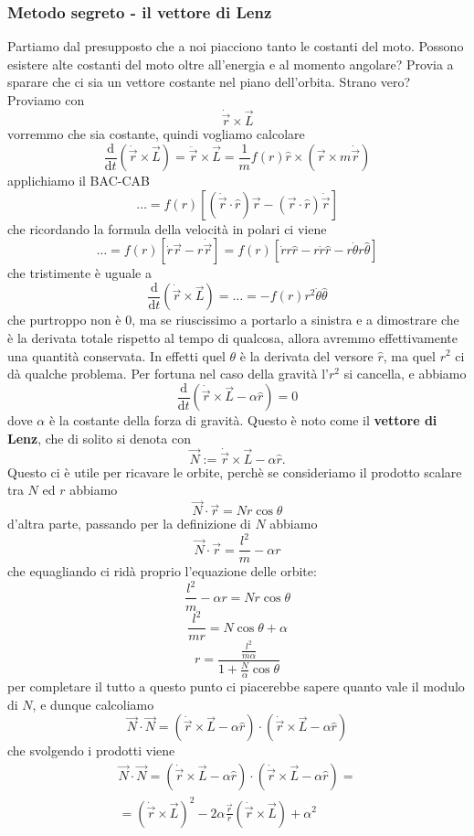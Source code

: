 \documentclass[11pt]{scrartcl}
\newcommand{\dif}{\text{d}}
\newcommand{\posit}{\vec{r}}
\newcommand{\veloc}{\dot{\vec{r}}}
\newcommand{\accel}{\ddot{\vec{r}}}
\begin{document}
	\newpage
	
	\subsubsection{Metodo segreto - il vettore di Lenz}
	
	Partiamo dal presupposto che a noi piacciono tanto le costanti del moto. Possono esistere alte costanti del moto oltre all'energia e al momento angolare? Provia a sparare che ci sia un vettore costante nel piano dell'orbita. Strano vero? Proviamo con 
	$$\veloc\times \vec{L}$$
	vorremmo che sia costante, quindi vogliamo calcolare
	$$\frac{\dif}{\dif t}\left(\veloc\times \vec{L}\right)=\accel\times \vec{L}=\frac{1}{m}f(r)\hat{r}\times \left(\posit\times m\veloc\right)$$
	applichiamo il BAC-CAB 
	$$\dots=f(r)\left[\left(\veloc \cdot \hat{r}\right)\posit-\left(\posit\cdot \hat{r}\right)\veloc\right]$$
	che ricordando la formula della velocità in polari ci viene
	$$\dots=f(r)\left[\dot{r}\posit-r\veloc\right]=f(r)\left[\dot{r}r\hat{r}-r\dot{r}\hat{r}-r\dot{\theta}r\hat{\theta}\right]$$
	che tristimente è uguale a 
	$$\frac{\dif}{\dif t}\left(\veloc\times \vec{L}\right)=\dots =-f(r)r^2\dot{\theta}\hat{\theta}$$
	che purtroppo non è $0$, ma se riuscissimo a portarlo a sinistra e a dimostrare che è la derivata totale rispetto al tempo di qualcosa, allora avremmo effettivamente una quantità conservata. In effetti quel $\theta$ è la derivata del versore $\hat{r}$, ma quel $r^2$ ci dà qualche problema. Per fortuna nel caso della gravità l'$r^2$ si cancella, e abbiamo
	$$\frac{\dif}{\dif t}\left(\veloc\times \vec{L}-\alpha\hat{r}\right)=0$$
	dove $\alpha$ è la costante della forza di gravità. Questo è noto come il \textbf{vettore di Lenz}, che di solito si denota con 
	$$\vec{N}:=\veloc\times \vec{L}-\alpha\hat{r}.$$
	Questo ci è utile per ricavare le orbite, perchè se consideriamo il prodotto scalare tra $N$ ed $r$ abbiamo
	$$\vec{N}\cdot\vec{r}=Nr\cos\theta$$
	d'altra parte, passando per la definizione di $N$ abbiamo
	$$\vec{N}\cdot\vec{r}=\frac{l^2}{m}-\alpha r$$
	che equagliando ci ridà proprio l'equazione delle orbite:
	$$\frac{l^2}{m}-\alpha r=Nr\cos \theta$$
	$$\frac{l^2}{mr}=N\cos\theta+\alpha$$
	$$r=\frac{\frac{l^2}{m\alpha}}{1+\frac{N}{\alpha}\cos\theta }$$
	per completare il tutto a questo punto ci piacerebbe sapere quanto vale il modulo di $N$, e dunque calcoliamo
	$$\vec{N}\cdot \vec{N}=\left(\veloc \times \vec{L}-\alpha\hat{r}\right)\cdot\left(\veloc\times \vec{L}-\alpha\hat{r}\right)$$
	che svolgendo i prodotti viene
	\begin{align*}
		\vec{N}\cdot \vec{N}=\left(\veloc \times \vec{L}-\alpha\hat{r}\right)\cdot\left(\veloc\times \vec{L}-\alpha\hat{r}\right)= \\
		=\left(\veloc\times\vec{L} \right)^2-2\alpha \frac{\posit}{r}\left(\veloc \times \vec{L}\right)+\alpha^2
	\end{align*}
\end{document}
